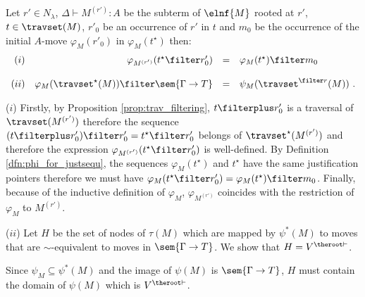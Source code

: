 \begin{lemma}
\label{lem:varphi_filter} Let $r'\in N_\lambda$, $\Delta \vdash M^{(r')} :
A$ be the subterm of $\elnf{M}$ rooted at $r'$, $t\in\travset(M)$,
$r'_0$ be an occurrence of $r'$ in $t$ and $m_0$ be the occurrence
of the initial $A$-move $\varphi_M(r'_0)$ in $\varphi_M(t^\star)$ then:
$$\begin{array}{rrcl}
(i)& \varphi_{M^{(r')}}(t^\star \filter r'_0) &=& \varphi_M(t^\star) \filter m_0 \\ \\
(ii) & \varphi_M(\travset^\star(M)) \filter \sem{\Gamma \rightarrow T} &=& \psi_M(\travset^{\filter r}(M))\ .
\end{array}
$$
\end{lemma}
\proof ($i$) Firstly, by Proposition \ref{prop:trav_filtering},
$t\filterplus r'_0$ is a traversal of $\travset(M^{(r')})$ therefore
the sequence $(t\filterplus r'_0) \filter r'_0 = t^\star \filter
r'_0$ belongs of $\travset^\star(M^{(r')})$ and therefore the
expression $\varphi_{M^{(r')}}(t^\star \filter r'_0)$ is
well-defined. By Definition \ref{dfn:phi_for_justsequ}, the
sequences $\varphi_M(t^\star)$ and $t^\star$ have the same
justification pointers therefore
 we must have $\varphi_{M}(t^\star \filter r'_0) = \varphi_M(t^\star) \filter m_0$. Finally, because of the inductive definition of $\varphi_{M}$, $\varphi_{M^{(r')}}$ coincides with
the restriction of $\varphi_{M}$ to $M^{(r')}$.


($ii$) Let $H$ be the set of nodes of $\tau(M)$ which are mapped by
$\psi^*(M)$ to moves that are $\sim$-equivalent to moves in
$\sem{\Gamma \rightarrow T}$. We show that $H = V^{\theroot\vdash}$.

Since $\psi_M \subseteq \psi^*(M)$ and the image of $\psi(M)$ is
$\sem{\Gamma \rightarrow T}$, $H$ must contain the domain of
$\psi(M)$ which is $V^{\theroot\vdash}$.

